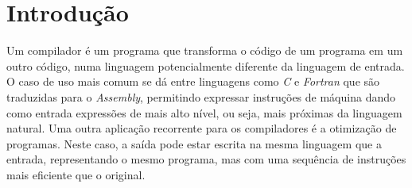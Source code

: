 \chapter{Introdução}
  
  Um compilador é um programa que transforma o código de um programa em um outro código, numa linguagem potencialmente diferente da linguagem de entrada\cite{aho:86}. O caso de uso mais comum se dá entre linguagens como \textit{C} e \textit{Fortran} que são traduzidas para o \textit{Assembly}, permitindo expressar instruções de máquina dando como entrada expressões de mais alto nível, ou seja, mais próximas da linguagem natural. Uma outra aplicação recorrente para os compiladores é a otimização de programas. Neste caso, a saída pode estar escrita na mesma linguagem que a entrada, representando o mesmo programa, mas com uma sequência de instruções mais eficiente que o original. \par
  